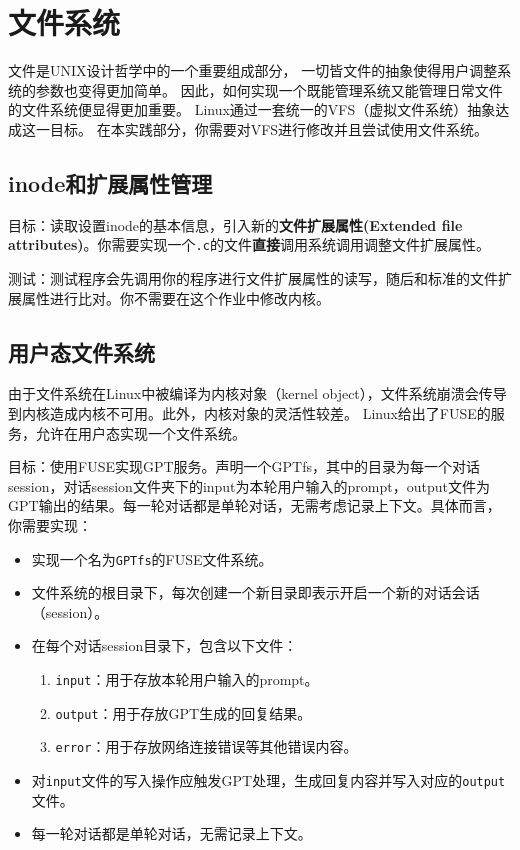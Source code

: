 \chapter{文件系统}
文件是UNIX设计哲学中的一个重要组成部分，
一切皆文件的抽象使得用户调整系统的参数也变得更加简单。
因此，如何实现一个既能管理系统又能管理日常文件的文件系统便显得更加重要。
Linux通过一套统一的VFS（虚拟文件系统）抽象达成这一目标。
在本实践部分，你需要对VFS进行修改并且尝试使用文件系统。

\section{inode和扩展属性管理}

目标：读取设置inode的基本信息，引入新的\textbf{文件扩展属性(Extended file attributes)}。你需要实现一个\texttt{.c}的文件\textbf{直接}调用系统调用调整文件扩展属性。


测试：测试程序会先调用你的程序进行文件扩展属性的读写，随后和标准的文件扩展属性进行比对。你不需要在这个作业中修改内核。



\section{用户态文件系统}
由于文件系统在Linux中被编译为内核对象（kernel object），文件系统崩溃会传导到内核造成内核不可用。此外，内核对象的灵活性较差。
Linux给出了FUSE的服务，允许在用户态实现一个文件系统。

目标：使用FUSE实现GPT服务。声明一个GPTfs，其中的目录为每一个对话session，对话session文件夹下的input为本轮用户输入的prompt，output文件为GPT输出的结果。每一轮对话都是单轮对话，无需考虑记录上下文。具体而言，你需要实现：

\begin{itemize}
\item 实现一个名为\texttt{GPTfs}的FUSE文件系统。
\item 文件系统的根目录下，每次创建一个新目录即表示开启一个新的对话会话（session）。
\item 在每个对话session目录下，包含以下文件：
\begin{enumerate}
\item \texttt{input}：用于存放本轮用户输入的prompt。
\item \texttt{output}：用于存放GPT生成的回复结果。
\item \texttt{error}：用于存放网络连接错误等其他错误内容。
\end{enumerate}
\item 对\texttt{input}文件的写入操作应触发GPT处理，生成回复内容并写入对应的\texttt{output}文件。
\item 每一轮对话都是单轮对话，无需记录上下文。
\end{itemize}


